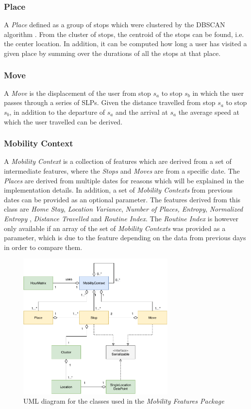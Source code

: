 \subsubsection*{Place}
A \textit{Place} defined as a group of stops which were clustered by the DBSCAN algorithm \cite{density-based-1996}. From the cluster of stops, the centroid of the stops can be found, i.e. the center location. In addition, it can be computed how long a user has visited a given place by summing over the durations of all the stops at that place.

\subsubsection*{Move}
A \textit{Move} is the displacement of the user from stop $s_a$ to stop $s_b$ in which the user passes through a series of SLPs. Given the distance travelled from stop $s_a$ to stop $s_b$, in addition to the departure of $s_a$ and the arrival at $s_a$ the average speed at which the user travelled can be derived. 

\subsubsection*{Mobility Context}
A \textit{Mobility Context} is a collection of features which are derived from a set of intermediate features, where the \textit{Stops} and \textit{Moves} are from a specific date. The \textit{Places} are derived from multiple dates for reasons which will be explained in the implementation details. In addition, a set of \textit{Mobility Contexts }from previous dates can be provided as an optional parameter. The features derived from this class are \textit{Home Stay}, \textit{Location Variance}, \textit{Number of Places, Entropy}, \textit{Normalized Entropy} , \textit{Distance Travelled} and \textit{Routine Index}. The \textit{Routine Index} is however only available if an array of the set of \textit{Mobility Contexts} was provided as a parameter, which is due to the feature depending on the data from previous days in order to compare them.

\begin{figure}[h]
    \centering
    \includegraphics[width=0.7\textwidth]{./images/uml-mobility.pdf}
    \caption{UML diagram for the classes used in the \textit{Mobility Features Package}}
    \label{fig:my_label}
\end{figure}


